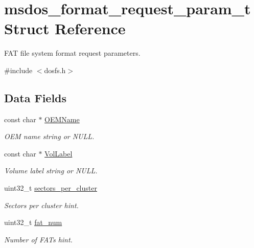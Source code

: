 \hypertarget{structmsdos__format__request__param__t}{}\section{msdos\+\_\+format\+\_\+request\+\_\+param\+\_\+t Struct Reference}
\label{structmsdos__format__request__param__t}


F\+AT file system format request parameters.  




{\ttfamily \#include $<$dosfs.\+h$>$}

\subsection*{Data Fields}
\begin{DoxyCompactItemize}
\item 
\mbox{\label{structmsdos__format__request__param__t_a4dba1050d812e26b4c2f29efa81b65ad}} 
const char $\ast$ \mbox{\hyperlink{structmsdos__format__request__param__t_a4dba1050d812e26b4c2f29efa81b65ad}{O\+E\+M\+Name}}
\begin{DoxyCompactList}\small\item\em O\+EM name string or N\+U\+LL. \end{DoxyCompactList}\item 
\mbox{\label{structmsdos__format__request__param__t_ae58842a2aa25b09295325132cab1de84}} 
const char $\ast$ \mbox{\hyperlink{structmsdos__format__request__param__t_ae58842a2aa25b09295325132cab1de84}{Vol\+Label}}
\begin{DoxyCompactList}\small\item\em Volume label string or N\+U\+LL. \end{DoxyCompactList}\item 
uint32\+\_\+t \mbox{\hyperlink{structmsdos__format__request__param__t_a2c1c74caf7bc79529632bc6afcdae6e1}{sectors\+\_\+per\+\_\+cluster}}
\begin{DoxyCompactList}\small\item\em Sectors per cluster hint. \end{DoxyCompactList}\item 
uint32\+\_\+t \mbox{\hyperlink{structmsdos__format__request__param__t_a04b64b7d96e0c4dc847c91c7f473d602}{fat\+\_\+num}}
\begin{DoxyCompactList}\small\item\em Number of F\+A\+Ts hint. \end{DoxyCompactList}\item 

\end{DoxyCompactItemize}
